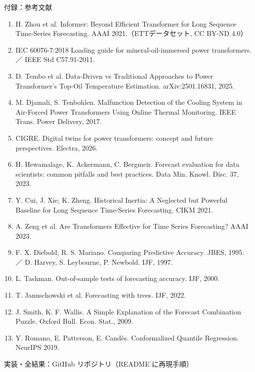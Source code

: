 \documentclass[aspectratio=169,10pt]{beamer}
\begin{document}
\begin{frame}{付録：参考文献}
  \tiny
  \begin{enumerate}\setlength{\itemsep}{0pt}
    \item H. Zhou et al. Informer: Beyond Efficient Transformer for Long Sequence Time-Series Forecasting. AAAI 2021.（ETTデータセット, CC BY-ND 4.0）
    \item IEC 60076-7:2018 Loading guide for mineral-oil-immersed power transformers. ／ IEEE Std C57.91-2011.
    \item D. Tembo et al. Data-Driven vs Traditional Approaches to Power Transformer's Top-Oil Temperature Estimation. arXiv:2501.16831, 2025.
    \item M. Djamali, S. Tenbohlen. Malfunction Detection of the Cooling System in Air-Forced Power Transformers Using Online Thermal Monitoring. IEEE Trans. Power Delivery, 2017.
    \item CIGRE. Digital twins for power transformers: concept and future perspectives. Electra, 2026.
    \item H. Hewamalage, K. Ackermann, C. Bergmeir. Forecast evaluation for data scientists: common pitfalls and best practices. Data Min. Knowl. Disc. 37, 2023.
    \item Y. Cui, J. Xie, K. Zheng. Historical Inertia: A Neglected but Powerful Baseline for Long Sequence Time-Series Forecasting. CIKM 2021.
    \item A. Zeng et al. Are Transformers Effective for Time Series Forecasting? AAAI 2023.
    \item F. X. Diebold, R. S. Mariano. Comparing Predictive Accuracy. JBES, 1995. ／ D. Harvey, S. Leybourne, P. Newbold. IJF, 1997.
    \item L. Tashman. Out-of-sample tests of forecasting accuracy. IJF, 2000.
    \item T. Januschowski et al. Forecasting with trees. IJF, 2022.
    \item J. Smith, K. F. Wallis. A Simple Explanation of the Forecast Combination Puzzle. Oxford Bull. Econ. Stat., 2009.
    \item Y. Romano, E. Patterson, E. Candès. Conformalized Quantile Regression. NeurIPS 2019.
  \end{enumerate}
  \vspace{0.2cm}
  {\scriptsize\color{muted}実装・全結果：GitHub リポジトリ（README に再現手順）}
\end{frame}
\end{document}
